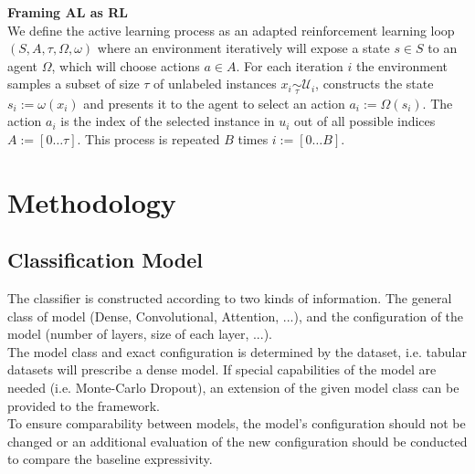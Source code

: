 \documentclass[]{article}
\begin{document}
%
\textbf{Framing AL as RL}\\
We define the active learning process as an adapted reinforcement learning loop $(S, A, \tau, \Omega, \omega)$ where an environment iteratively will expose a state $s \in S$ to an agent $\Omega$, which will choose actions $a \in A$.
For each iteration $i$ the environment samples a subset of size $\tau$ of unlabeled instances $x_i \underset{\tau}{\sim} \mathcal{U}_i$, constructs the state $s_i := \omega(x_i)$ and presents it to the agent to select an action $a_i := \Omega(s_i)$.
The action $a_i$ is the index of the selected instance in $u_i$ out of all possible indices $A := [0 \ldots \tau]$.
This process is repeated $B$ times $i := [0 \ldots B]$.

\section{Methodology}

\subsection{Classification Model}
The classifier is constructed according to two kinds of information.
The general class of model (Dense, Convolutional, Attention, ...), and the configuration of the model (number of layers, size of each layer, ...). \\
The model class and exact configuration is determined by the dataset, i.e. tabular datasets will prescribe a dense model.
If special capabilities of the model are needed (i.e. Monte-Carlo Dropout), an extension of the given model class can be provided to the framework. \\ [1mm]
To ensure comparability between models, the model's configuration should not be changed or an additional evaluation of the new configuration should be conducted to compare the baseline expressivity.
\end{document}
